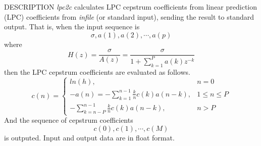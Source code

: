 % 
% 
% 
% 
%                                                                        
%

\begin{synopsis}
 \item[lpc2c] [ --m $M_1$ ] [ --M $M_2$ ] [ {\em infile} ]
\end{synopsis}
\begin{qsection}{DESCRIPTION}
{\em lpc2c} calculates LPC cepstrum coefficients 
from linear prediction (LPC) coefficients 
from {\em infile} (or standard input), 
sending the result to standard output.
That is, when the input sequence is 
\[ \sigma, a(1), a(2), \cdots, a(p) \]
where
\[
H(z)=\frac{\sigma}{A(z)}=\frac{\sigma}{\displaystyle 1+\sum_{k=1}^P a(k) z^{-k}}
\]
then the LPC cepstrum coefficients are evaluated as follows.
\[
c(n) =\left\{
\begin{array}{lc}
 ln(h),&n=0\\
\displaystyle -a(n)=-\sum^{n-1}_{k=1}\frac{k}{n}c(k) a(n-k),&1\leq n\leq P\\
\displaystyle -\sum_{k=n-P}^{n-1}\frac{k}{n}c(k) a(n-k),& n>P
\end{array}
\right.
\]
And the sequence of cepstrum coefficients
\[ c(0), c(1), \cdots, c(M) \]
is outputed.
Input and output data are in float format.
\end{qsection}

